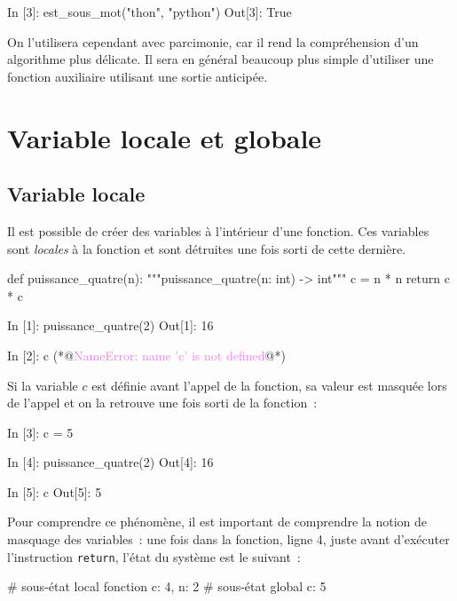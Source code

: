 \documentclass{magnolia}
\begin{document}
\begin{pythoncode}
In [3]: est_sous_mot("thon", "python")
Out[3]: True
\end{pythoncode}
\noindent
On l'utilisera cependant avec parcimonie, car il rend la compréhension d'un algorithme plus délicate. Il sera en
général beaucoup plus simple d'utiliser une fonction auxiliaire utilisant une sortie anticipée.





\section{Variable locale et globale}
\subsection{Variable locale}


Il est possible de créer des variables à l'intérieur d'une fonction. Ces variables sont
\emph{locales} à la fonction et sont détruites une fois sorti de cette dernière.

\begin{pythoncodeline}
def puissance_quatre(n):
    """puissance_quatre(n: int) -> int"""
    c = n * n
    return c * c
\end{pythoncodeline}

\begin{pythoncode}
In [1]: puissance_quatre(2)
Out[1]: 16

In [2]: c
(*@\textcolor{violet}{NameError: name 'c' is not defined}@*)
\end{pythoncode}

\noindent
Si la variable $c$ est définie avant l'appel de la fonction, sa valeur est
masquée lors de l'appel et on la retrouve une fois sorti de la fonction~:

\begin{pythoncode}
In [3]: c = 5

In [4]: puissance_quatre(2)
Out[4]: 16

In [5]: c
Out[5]: 5
\end{pythoncode}

\noindent
Pour comprendre ce phénomène, il est important de comprendre la notion de masquage des variables~:
une fois dans la fonction, ligne 4, juste avant d'exécuter l'instruction \verb_return_,
l'état du système est le suivant~:

\begin{pythoncode}
# sous-état local fonction  {c: 4, n: 2}
# sous-état global          {c: 5}
\end{pythoncode}
\end{document}
